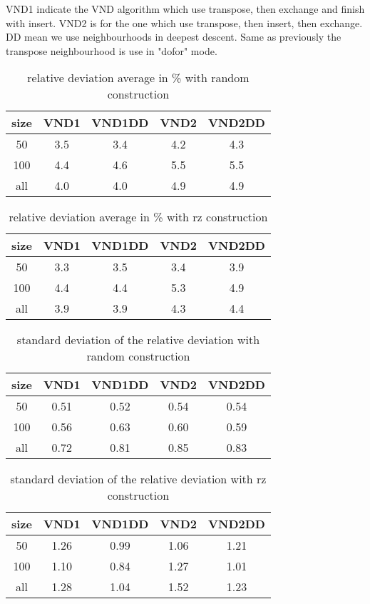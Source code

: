 \documentclass[12pt,a4paper]{article}
\begin{document}
VND1 indicate the VND algorithm which use transpose, then exchange and finish with insert. VND2 is for the one which use transpose, then insert, then exchange. DD mean we use neighbourhoods in deepest descent. Same as previously the transpose neighbourhood is use in "dofor" mode.

\begin{table}[!h]
\centering
\begin{tabular}{|*{5}{c|}}
  \hline
  size & VND1 & VND1DD & VND2 & VND2DD\\
  \hline
  50 & 3.5 & 3.4 & 4.2 & 4.3 \\ 
  100 & 4.4 & 4.6 & 5.5 & 5.5 \\
  all & 4.0 & 4.0 & 4.9 & 4.9 \\
  \hline
\end{tabular}
\caption{relative deviation average in \% with random construction}
\label{relative deviation of VND with random construction}
\end{table}

\begin{table}[!h]
\centering
\begin{tabular}{|*{5}{c|}}
  \hline
  size & VND1 & VND1DD & VND2 & VND2DD\\
  \hline
  50 & 3.3 & 3.5 & 3.4 & 3.9 \\ 
  100 & 4.4 & 4.4 & 5.3 & 4.9 \\
  all & 3.9 & 3.9 & 4.3 & 4.4 \\
  \hline
\end{tabular}
\caption{relative deviation average in \% with rz construction}
\label{relative deviation of VND with rz construction}
\end{table}

\begin{table}[!h]
\centering
\begin{tabular}{|*{5}{c|}}
  \hline
  size & VND1 & VND1DD & VND2 & VND2DD\\
  \hline
  50 & 0.51 & 0.52 & 0.54 & 0.54 \\ 
  100 & 0.56 & 0.63 & 0.60 & 0.59 \\
  all & 0.72 & 0.81 & 0.85 & 0.83 \\
  \hline
\end{tabular}
\caption{standard deviation of the relative deviation with random construction}
\label{standard deviation of the relative deviation of VND with random construction}
\end{table}

\begin{table}[!h]
\centering
\begin{tabular}{|*{5}{c|}}
  \hline
  size & VND1 & VND1DD & VND2 & VND2DD\\
  \hline
  50 & 1.26 & 0.99 & 1.06 & 1.21 \\ 
  100 & 1.10 & 0.84 & 1.27 & 1.01 \\
  all & 1.28 & 1.04 & 1.52 & 1.23 \\
  \hline
\end{tabular}
\caption{standard deviation of the relative deviation with rz construction}
\label{standard deviation of the relative deviation of VND with rz construction}
\end{table}
\end{document}
